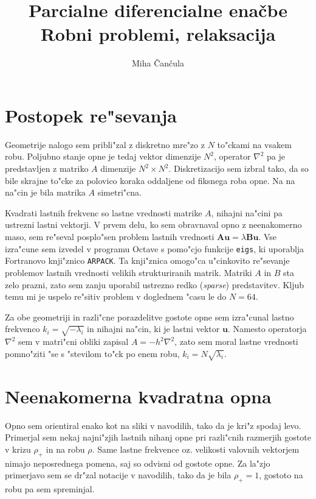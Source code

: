 \documentclass[a4paper,10pt]{article}
\title{Parcialne diferencialne ena\v cbe \\ Robni problemi, relaksacija}
\author{Miha \v Can\v cula}
\renewcommand{\vec}{\mathbf}
\begin{document}
\maketitle

\section{Postopek re"sevanja}

Geometrije nalogo sem pribli"zal z diskretno mre"zo z $N$ to"ckami na vsakem robu. Poljubno stanje opne je tedaj vektor dimenzije $N^2$, operator $\nabla^2$ pa je predstavljen z matriko $A$ dimenzije $N^2 \times N^2$. Diskretizacijo sem izbral tako, da so bile skrajne to"cke za polovico koraka oddaljene od fiksnega roba opne. Na na na"cin je bila matrika $A$ simetri"cna. 

Kvadrati lastnih frekvenc so lastne vrednosti matrike $A$, nihajni na"cini pa ustrezni lastni vektorji. V prvem delu, ko sem obravnaval opno z neenakomerno maso, sem re"seval posplo"sen problem lastnih vrednosti $\vec A\vec u = \lambda \vec B \vec u$. Vse izra"cune sem izvedel v programu Octave s pomo"cjo funkcije \texttt{eigs}, ki uporablja Fortranovo knji"znico \texttt{ARPACK}. Ta knji"znica omogo"ca u"cinkovito re"sevanje problemov lastnih vrednosti velikih strukturiranih matrik. Matriki $A$ in $B$ sta zelo prazni, zato sem zanju uporabil ustrezno redko (\textit{sparse}) predstavitev. Kljub temu mi je uspelo re"sitiv problem v doglednem "casu le do $N = 64$. 

Za obe geometriji in razli"cne porazdelitve gostote opne sem izra"cunal lastno frekvenco $k_i = \sqrt{-\lambda_i}$ in nihajni na"cin, ki je lastni vektor $\vec u$. Namesto operatorja $\nabla^2$ sem v matri"cni obliki zapisal $A = -h^2\nabla^2$, zato sem moral lastne vrednosti pomno"ziti "se s "stevilom to"ck po enem robu, $k_i = N\sqrt{\lambda_i}$. 

\section{Neenakomerna kvadratna opna}

Opno sem orientiral enako kot na sliki v navodilih, tako da je kri"z spodaj levo. Primerjal sem nekaj najni"zjih lastnih nihanj opne pri razli"cnih razmerjih gostote v krizu $\rho_+$ in na robu $\rho$. Same lastne frekvence oz. velikosti valovnih vektorjem nimajo neposrednega pomena, saj so odvisni od gostote opne. Za la"zjo primerjavo sem se dr"zal notacije v navodilih, tako da je bila $\rho_+ = 1$, gostoto na robu pa sem spreminjal. 
\end{document}

